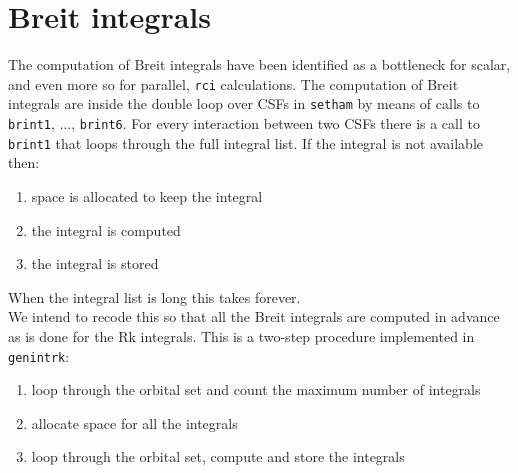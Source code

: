 \documentclass[a4paper,titlepage]{article}
\begin{document}
\section{Breit integrals}
The computation of Breit integrals have been identified as a bottleneck for scalar, and even more so for parallel, \verb+rci+ calculations.
The computation of Breit integrals are inside the double loop over CSFs in \verb+setham+ by means of calls to \verb+brint1+, ..., \verb+brint6+. 
For every interaction between two CSFs there is a call to \verb+brint1+ that loops through the full integral list. If the integral is not available then: 
\begin{enumerate}
\item space is allocated to keep the integral
\item the integral is computed
\item the integral is stored
\end{enumerate}
When the integral list is long this takes forever.\medskip\\
We intend to recode this so that all the Breit integrals are computed in advance as is done for the Rk integrals. This is a two-step procedure implemented in \verb+genintrk+:
\begin{enumerate}
\item loop through the orbital set and count the maximum number of integrals
\item allocate space for all the integrals
\item loop through the orbital set, compute and store the integrals
\end{enumerate} 
\end{document}
